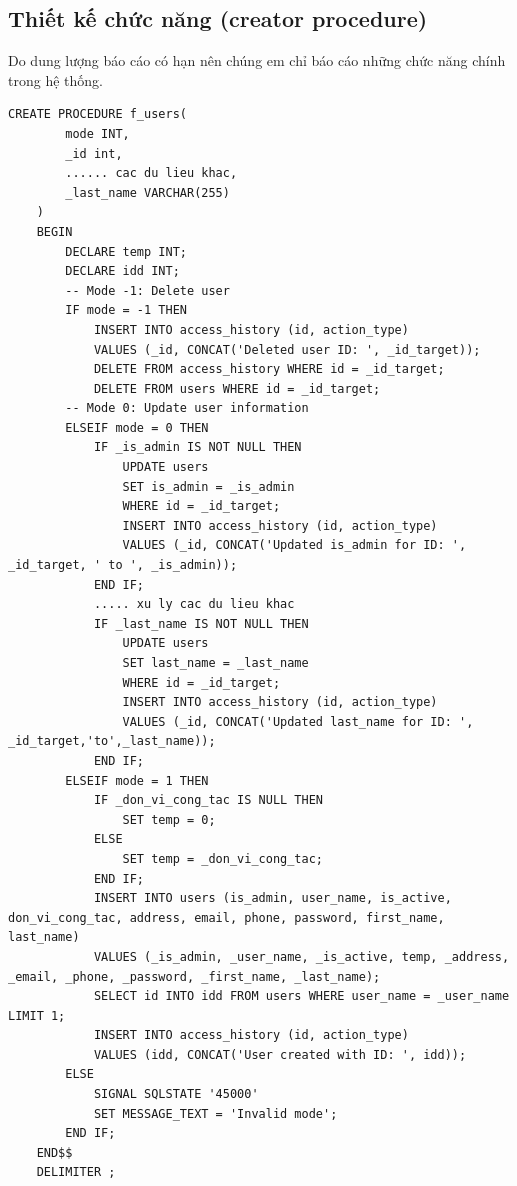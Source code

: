 \documentclass{article} %
\begin{document}
\newpage
\subsection{Thiết kế chức năng (creator procedure)}

Do dung lượng báo cáo có hạn nên chúng em chỉ báo cáo những chức năng chính trong hệ thống.

\begin{lstlisting}[caption={FUsers Creater Procedure Definition}, label={tab:FUsers}]   
    CREATE PROCEDURE f_users(
        mode INT,
        _id int,
        ...... cac du lieu khac,
        _last_name VARCHAR(255)
    )
    BEGIN
        DECLARE temp INT;
        DECLARE idd INT;
        -- Mode -1: Delete user
        IF mode = -1 THEN
            INSERT INTO access_history (id, action_type)
            VALUES (_id, CONCAT('Deleted user ID: ', _id_target));
            DELETE FROM access_history WHERE id = _id_target;
            DELETE FROM users WHERE id = _id_target;  
        -- Mode 0: Update user information
        ELSEIF mode = 0 THEN
            IF _is_admin IS NOT NULL THEN
                UPDATE users
                SET is_admin = _is_admin
                WHERE id = _id_target;
                INSERT INTO access_history (id, action_type)
                VALUES (_id, CONCAT('Updated is_admin for ID: ', _id_target, ' to ', _is_admin));
            END IF;
            ..... xu ly cac du lieu khac
            IF _last_name IS NOT NULL THEN
                UPDATE users
                SET last_name = _last_name
                WHERE id = _id_target;
                INSERT INTO access_history (id, action_type)
                VALUES (_id, CONCAT('Updated last_name for ID: ', _id_target,'to',_last_name));
            END IF;
        ELSEIF mode = 1 THEN
            IF _don_vi_cong_tac IS NULL THEN 
                SET temp = 0;
            ELSE 
                SET temp = _don_vi_cong_tac;
            END IF;
            INSERT INTO users (is_admin, user_name, is_active, don_vi_cong_tac, address, email, phone, password, first_name, last_name)
            VALUES (_is_admin, _user_name, _is_active, temp, _address, _email, _phone, _password, _first_name, _last_name);
            SELECT id INTO idd FROM users WHERE user_name = _user_name LIMIT 1;
            INSERT INTO access_history (id, action_type)
            VALUES (idd, CONCAT('User created with ID: ', idd));    
        ELSE
            SIGNAL SQLSTATE '45000'
            SET MESSAGE_TEXT = 'Invalid mode';
        END IF;
    END$$
    DELIMITER ; 
\end{lstlisting}
\end{document}
